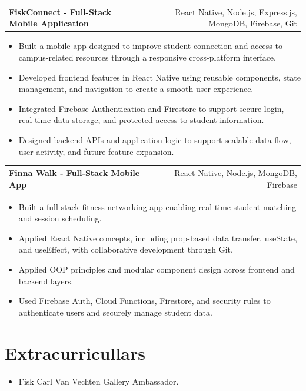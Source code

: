 \documentclass[10pt,letterpaper]{article}
\newcommand{\resumeItemListStart}{\begin{itemize}}
\newcommand{\resumeItemListEnd}{\end{itemize}}
\newcommand{\resumeProjectHeading}[2]{
  \vspace{1pt}
  \begin{tabularx}{\textwidth}{Xr}
    \textbf{#1} & #2 \\
  \end{tabularx}\vspace{-3pt}
}
\begin{document}
\resumeProjectHeading
{FiskConnect - Full-Stack Mobile Application} {React Native, Node.js, Express.js, MongoDB, Firebase, Git}
\resumeItemListStart
    \item Built a mobile app designed to improve student connection and access to campus-related resources through a responsive cross-platform interface.
    \item Developed frontend features in React Native using reusable components, state management, and navigation to create a smooth user experience.
    \item Integrated Firebase Authentication and Firestore to support secure login, real-time data storage, and protected access to student information.
    \item Designed backend APIs and application logic to support scalable data flow, user activity, and future feature expansion.
\resumeItemListEnd

\resumeProjectHeading
{Finna Walk - Full-Stack Mobile App} {React Native, Node.js, MongoDB, Firebase}
\resumeItemListStart
    \item Built a full-stack fitness networking app enabling real-time student matching and session scheduling.
    \item Applied React Native concepts, including prop-based data transfer, useState, and useEffect, with collaborative development through Git.
    \item Applied OOP principles and modular component design across frontend and backend layers.
    \item Used Firebase Auth, Cloud Functions, Firestore, and security rules to authenticate users and securely manage student data.
\resumeItemListEnd

\section*{Extracurricullars}
\resumeItemListStart
    \item Fisk Carl Van Vechten Gallery Ambassador. 
\resumeItemListEnd
\end{document}
